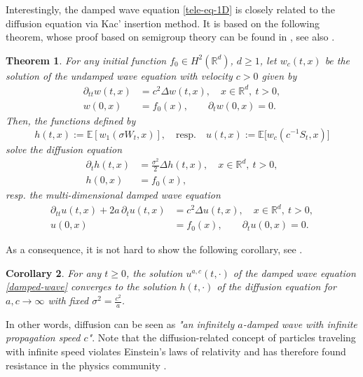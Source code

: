 \documentclass{article}
\newcommand{\R}{\mathbb{R}}
\newcommand{\ex}{\mathbb E}
\theoremstyle{plain}
\newtheorem{theorem}{Theorem}[section]
\newtheorem{corollary}[theorem]{Corollary}
\theoremstyle{definition}
\theoremstyle{remark}
\begin{document}
Interestingly, the damped wave equation \eqref{tele-eq-1D} is closely related to the diffusion equation 
via Kac' insertion method.
It is based on the following theorem, whose proof based on semigroup theory can be found in \cite{GH1971}, see also \cite{J1990,KAC1974}.

\begin{theorem}\label{insertion-multi-d}
For any initial function $f_0 \in H^2(\R^d)$, $d \ge 1$, let  $w_c(t,x)$ be
the solution of the \emph{undamped} wave equation with velocity $c > 0$ given by
\begin{align}\label{undamped-wave}
    \partial_{tt} w(t,x) &= c^2 \Delta w(t,x), \quad x \in \R^d, ~ t > 0,\nonumber\\
    w(0,x) &= f_0(x),\qquad
    \partial_t w(0,x) = 0.
\end{align}
Then, the functions defined by
\begin{equation}\label{tele-sol-general}
h(t,x):= \mathbb{E}\left[w_1 \left(\sigma W_t,x \right) \right],  \quad \text{resp.} \quad
    u(t,x) := \ex \big[ w_c(c^{-1} S_t, x)\big]
\end{equation}
solve the 
diffusion equation
\begin{align}\label{heat-eq}
    \partial_t h(t,x)& = \frac{\sigma^2}{2} \Delta h(t,x), \quad x \in \R^d, ~ t > 0,
       \\
    h(0,x) &= f_0(x),
\end{align}   
resp. the multi-dimensional damped wave equation 
\begin{align}\label{damped-wave}
    \partial_{tt} u(t,x) + 2a \, \partial_{t} u(t,x) &= c^2 \Delta u(t,x), \quad x \in \R^d, ~ t > 0,\nonumber\\
    u(0,x) &= f_0(x), \qquad
    \partial_t u(0,x) = 0.
\end{align} 
\end{theorem}

As a consequence, it is not hard to show the following corollary,
see \cite{DCFS2025}.

\begin{corollary}\label{a-c-to-infinity}
For any $t \ge 0$, the solution $u^{a,c}(t,\cdot)$ of the damped wave equation \eqref{damped-wave} converges to the solution $h(t,\cdot)$ of the diffusion equation 
for $a,c \to \infty$ with fixed $\sigma^2 = \frac{c^2}{a}$.
\end{corollary}

In other words, diffusion can be seen as \emph{"an infinitely $a$-damped wave with infinite propagation speed $c$"}. Note that  the diffusion-related concept of particles traveling with infinite speed violates Einstein's laws of relativity and has therefore
found resistance in the physics community \cite{C1958,  C1963, V1958, TL2016}. 
\end{document}
